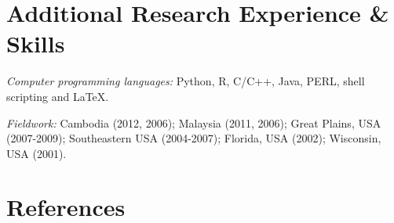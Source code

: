 \documentclass[10pt]{article}
\newcommand{\myHangIndent}{\hangindent=5mm}
\begin{document}
\section*{Additional Research Experience \& Skills}
\myHangIndent
{\sffamily\itshape Computer programming languages:} Python, R, C/C++, Java,
PERL, shell scripting and \LaTeX.

\myHangIndent
{\sffamily\itshape Fieldwork:} Cambodia (2012, 2006); Malaysia (2011, 2006);
Great Plains, USA (2007-2009); Southeastern USA (2004-2007); Florida, USA
(2002); Wisconsin, USA (2001).

\section*{References}

\end{document}
